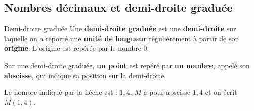 \begin{pageCours} 


\section{Nombres décimaux et demi-droite graduée}

\begin{DefT}{Demi-droite graduée}
Une \textbf{demi-droite graduée} est une \textbf{demi-droite} sur laquelle on a reporté une \textbf{unité de longueur} régulièrement à partir de son \textbf{origine}. L'origine est repérée par le nombre $0$.

Sur une demi-droite graduée, \textbf{un point} est repéré par \textbf{un nombre}, appelé son \textbf{abscisse}, qui indique sa position sur la demi-droite.

\end{DefT}

\begin{Rep}
Le nombre indiqué par la flèche est : $1,4$. $M$ a pour abscisse $1,4$ et on écrit $M(1,4)$.
 

\end{Rep}
\end{pageCours}
